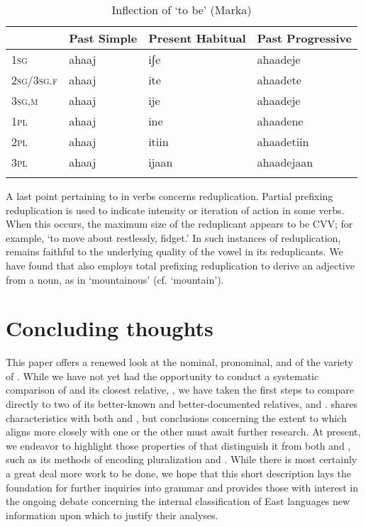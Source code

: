 \documentclass[output=paper,modfonts,nonflat,
hidelinks
]{langsci/langscibook}
\begin{document}
  \begin{table}
 	\caption{{Inflection of `to be' (Marka)}}
 	\label{tab:1:ToBe}
 	\begin{tabularx}{\textwidth}{XXXl} 
 		\lsptoprule
 		& Past Simple   &  Present Habitual & Past Progressive    \\  
 		\midrule
 		1\textsc{sg} & ahaaj & iʃe & ahaadeje \\
 		2\textsc{sg}/3\textsc{sg.f} & ahaaj  & ite & ahaadete   \\
 		3\textsc{sg.m} & ahaaj & ije & ahaadeje  \\
 		1\textsc{pl} & ahaaj & ine & ahaadene  \\
 		2\textsc{pl} & ahaaj & itiin & ahaadetiin  \\
 		3\textsc{pl} & ahaaj & ijaan & ahaadejaan \\
 		\lspbottomrule
 	\end{tabularx}
 \end{table}
 
 A last point pertaining to  in  verbs concerns reduplication. Partial prefixing reduplication is used to indicate intensity or iteration of action in some verbs.  When this occurs, the maximum size of the reduplicant appears to be CVV; for example,  `to move about restlessly, fidget.' In such instances of reduplication,  remains faithful to the underlying quality of the vowel in its reduplicants. We have found that  also employs total prefixing reduplication to derive an adjective from a noun, as in  `mountainous' (cf.  `mountain'). 
 
 \section{Concluding thoughts}
 \largerpage
 This paper offers a renewed look at the nominal, pronominal, and  of the  variety of . While we have not yet had the opportunity to conduct a systematic comparison of  and its closest relative, , we have taken the first steps to compare  directly to two of its better-known and better-documented relatives,  and .  shares characteristics with both  and , but conclusions concerning the extent to which  aligns more closely with one or the other must await further research. At present, we endeavor to highlight those properties of  that distinguish it from both  and , such as its methods of encoding pluralization and . While there is most certainly a great deal more work to be done, we hope that this short description lays the foundation for further inquiries into  grammar and provides those with interest in the ongoing debate concerning the internal classification of East  languages new information upon which to justify their analyses.
 
\end{document}
